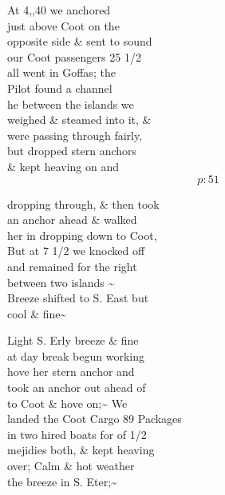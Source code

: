 \documentclass{report}
\begin{document}
	\par{
 	At 4,,40 we anchored\ \\just above Coot on the\ \\opposite side \& sent to sound\ \\our Coot passengers 25 1/2\ \\all went in Goffas; the\ \\Pilot found a channel\ \\he between the islands we\ \\weighed \& steamed into it, \&\ \\were passing through fairly,\ \\but dropped stern anchors\ \\\& kept heaving on and\ \\
  \[p: 51 \]

	}






	\par{
 	dropping through, \& then took\ \\an anchor ahead \& walked\ \\her in dropping down to Coot,\ \\But at 7 1/2 we knocked off\ \\and remained for the right\ \\between two islands \~{}\ \\Breeze shifted to S. East but\ \\cool \& fine\~{}\ \\
	}

	\par{
 	Light S. Erly breeze \& fine\ \\at day break begun working\ \\hove her stern anchor and\ \\took an anchor out ahead of\ \\to Coot \& hove on;\~{} We\ \\landed the Coot Cargo 89 Packages\ \\in two hired boats for of 1/2\ \\mejidies both, \& kept heaving\ \\over; Calm \& hot weather\ \\the breeze in S. Eter;\~{}\ \\
	}
\end{document}
